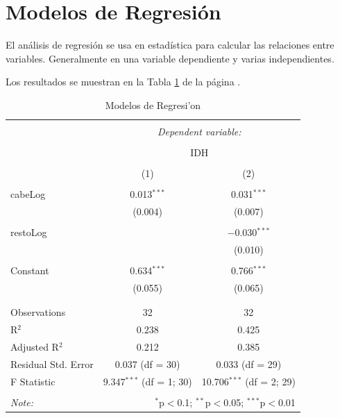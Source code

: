 \documentclass{article}
\begin{document}
\clearpage

\section{Modelos de Regresi\'on}

El an\'alisis de regresi\'on se usa en estad\'istica para calcular las relaciones entre variables. Generalmente en una variable dependiente y varias independientes.

Los resultados se muestran en la Tabla \ref{regresiones} de la p\'agina \pageref{regresiones}.


\begin{table}[!htbp] \centering 
  \caption{Modelos de Regresi'on} 
  \label{regresiones} 
\begin{tabular}{@{\extracolsep{5pt}}lcc} 
\\[-1.8ex]\hline 
\hline \\[-1.8ex] 
 & \multicolumn{2}{c}{\textit{Dependent variable:}} \\ 
\cline{2-3} 
\\[-1.8ex] & \multicolumn{2}{c}{IDH} \\ 
\\[-1.8ex] & (1) & (2)\\ 
\hline \\[-1.8ex] 
 cabeLog & 0.013$^{***}$ & 0.031$^{***}$ \\ 
  & (0.004) & (0.007) \\ 
  & & \\ 
 restoLog &  & $-$0.030$^{***}$ \\ 
  &  & (0.010) \\ 
  & & \\ 
 Constant & 0.634$^{***}$ & 0.766$^{***}$ \\ 
  & (0.055) & (0.065) \\ 
  & & \\ 
\hline \\[-1.8ex] 
Observations & 32 & 32 \\ 
R$^{2}$ & 0.238 & 0.425 \\ 
Adjusted R$^{2}$ & 0.212 & 0.385 \\ 
Residual Std. Error & 0.037 (df = 30) & 0.033 (df = 29) \\ 
F Statistic & 9.347$^{***}$ (df = 1; 30) & 10.706$^{***}$ (df = 2; 29) \\ 
\hline 
\hline \\[-1.8ex] 
\textit{Note:}  & \multicolumn{2}{r}{$^{*}$p$<$0.1; $^{**}$p$<$0.05; $^{***}$p$<$0.01} \\ 
\end{tabular} 
\end{table} 
\end{document}
